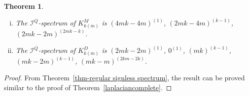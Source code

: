 \documentclass[12pt]{article}
\numberwithin{equation}{section}
\newtheorem{thm}{Theorem}[section]
\begin{document}
	
	\begin{thm}\label{signlesslaplaciancomplete}
		\begin{enumerate}[(i)]
			\item The $\mathcal{I}^Q$-spectrum of $K^M_{k(m)}$ is $(4mk-4m)^{(1)}$, $(2mk-4m)^{(k-1)}$, $(2mk-2m)^{(2mk-k)}$.
			\item The $\mathcal{I}^Q$-spectrum of $K^D_{k(m)}$ is $(2mk-2m)^{(1)}$, $0^{(1)}$, $(mk)^{(k-1)}$, $(mk-2m)^{(k-1)}$, $(mk-m)^{(2km-2k)}$.
		\end{enumerate}
	\end{thm}
	\begin{proof}
		 From Theorem~\ref{thm-regular signless spectrum}, the result can be proved similar to the proof of Theorem~\ref{laplaciancomplete}.
	\end{proof}
	
\end{document}
